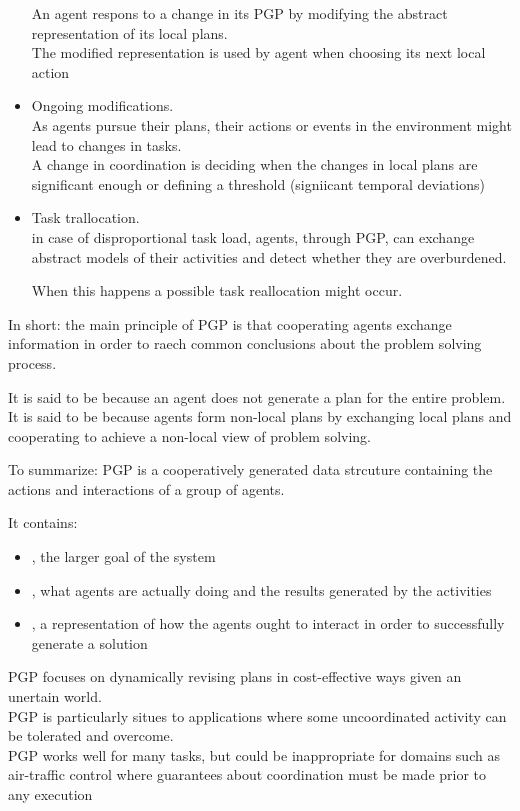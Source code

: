 \begin{itemize}
An agent respons to a change in its PGP by modifying the abstract representation of its local plans.\\
The modified representation is used by agent when choosing its next local action
\item Ongoing modifications.\\
As agents pursue their plans, their actions or events in the environment might lead to changes in tasks.\\
A change in coordination is deciding when the changes in local plans are significant enough or defining a threshold (signiicant temporal deviations)
\item Task trallocation.\\
in case of disproportional task load, agents, through PGP, can exchange abstract models of their activities and detect whether they are overburdened.

When this happens a possible task reallocation might occur.
\end{itemize}

In short: the main principle of PGP is that cooperating agents exchange information in order to raech common conclusions about the problem solving process.

It is said to be  because an agent does not generate a plan for the entire problem.\\
It is said to be  because agents form non-local plans by exchanging local plans and cooperating to achieve a non-local view of problem solving.

To summarize: PGP is a cooperatively generated data strcuture containing the actions and interactions of a group of agents.

It contains:
\begin{itemize}
\item {}, the larger goal of the system
\item {}, what agents are actually doing and the results generated by the activities
\item {}, a representation of how the agents ought to interact in order to successfully generate a solution
\end{itemize}
PGP focuses on dynamically revising plans in cost-effective ways given an unertain world.\\
PGP is particularly situes to applications where some uncoordinated activity can be tolerated and overcome.\\
PGP works well for many tasks, but could be inappropriate for domains such as air-traffic control where guarantees about coordination must be made prior to any execution

